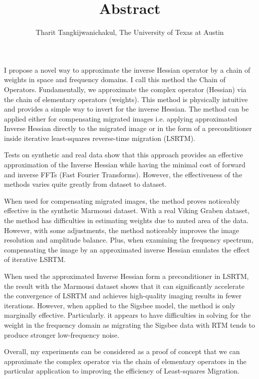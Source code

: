 \author{Tharit Tangkijwanichakul, The University of Texas at Austin}
\title{Abstract}
\label{ch:abs}
I propose a novel way to approximate the inverse Hessian operator by a chain of weights in space and frequency domains. I call this method the Chain of Operators. Fundamentally, we approximate the complex operator (Hessian) via the chain of elementary operators (weights). This method is physically intuitive and provides a simple way to invert for the inverse Hessian. The method can be applied either for compensating migrated images i.e. applying approximated Inverse Hessian directly to the migrated image or in the form of a preconditioner inside iterative least-squares reverse-time migration (LSRTM). 

Tests on synthetic and real data show that this approach provides an effective approximation of the Inverse Hessian while having the minimal cost of forward and inverse FFTs (Fast Fourier Transforms). However, the effectiveness of the methods varies quite greatly from dataset to dataset.

When used for compensating migrated images, the method proves noticeably effective in the synthetic Marmousi dataset. With a real Viking Graben dataset, the method has difficulties in estimating weights due to muted area of the data. However, with some adjustments, the method noticeably improves the image resolution and amplitude balance. Plus, when examining the frequency spectrum, compensating the image by an approximated inverse Hessian emulates the effect of iterative LSRTM. 


When used the approximated Inverse Hessian form a preconditioner in LSRTM, the result with the Marmousi dataset shows that it can significantly accelerate the convergence of LSRTM and achieves high-quality imaging results in fewer iterations. However, when applied to the Sigsbee model, the method is only marginally effective. Particularly. it appears to have difficulties in solving for the weight in the frequency domain as migrating the Sigsbee data with RTM tends to produce stronger low-frequency noise.

Overall, my experiments can be considered as a proof of concept that we can approximate the complex operator via the chain of elementary operators in the particular application to improving the efficiency of Least-squares Migration.